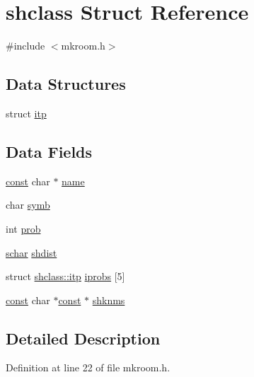 \hypertarget{structshclass}{\section{shclass Struct Reference}
\label{structshclass}
}


{\ttfamily \#include $<$mkroom.\+h$>$}

\subsection*{Data Structures}
\begin{DoxyCompactItemize}
\item 
struct \hyperlink{structshclass_1_1itp}{itp}
\end{DoxyCompactItemize}
\subsection*{Data Fields}
\begin{DoxyCompactItemize}
\item 
\hyperlink{tradstdc_8h_a2c212835823e3c54a8ab6d95c652660e}{const} char $\ast$ \hyperlink{structshclass_a71ad98963f918e1270195a2250a6c8ef}{name}
\item 
char \hyperlink{structshclass_a98ea09cf2eb88407663968a88979447c}{symb}
\item 
int \hyperlink{structshclass_ac06a28af6ce109f210229d33e089359d}{prob}
\item 
\hyperlink{config_8h_a0fd9ce9d735064461bebfe6037026093}{schar} \hyperlink{structshclass_a27c288f51d2e95f99c82aaff1ac1d3a9}{shdist}
\item 
struct \hyperlink{structshclass_1_1itp}{shclass\+::itp} \hyperlink{structshclass_a7e5655e60c035d00bc528b503296c2d6}{iprobs} \mbox{[}5\mbox{]}
\item 
\hyperlink{tradstdc_8h_a2c212835823e3c54a8ab6d95c652660e}{const} char $\ast$\hyperlink{tradstdc_8h_a2c212835823e3c54a8ab6d95c652660e}{const} $\ast$ \hyperlink{structshclass_aa8fc85f694980814eeee8c91ef7f75a4}{shknms}
\end{DoxyCompactItemize}


\subsection{Detailed Description}


Definition at line 22 of file mkroom.\+h.



